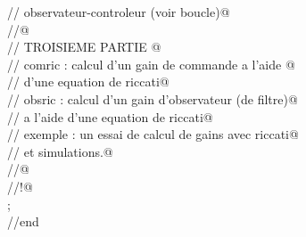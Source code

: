 {\begin{flushleft}
{$$\cmarg \verb@//               observateur-controleur (voir boucle)@\\ 
\cmarg \verb@//@\\ 
\cmarg \verb@//    TROISIEME PARTIE @\\ 
\cmarg \verb@// comric   :  calcul d'un gain de commande a l'aide @\\ 
\cmarg \verb@//          d'une equation de riccati@\\ 
\cmarg \verb@// obsric   :  calcul d'un gain d'observateur (de filtre)@\\ 
\cmarg \verb@//          a l'aide d'une equation de riccati@\\ 
\cmarg \verb@// exemple  : un essai de calcul de gains avec riccati@\\ 
\cmarg \verb@//          et simulations.@\\ 
\cmarg \verb@//@\\ 
\cmarg \verb@//!@\\ 
;\\ 
\cmarg //end}
\end{flushleft}}




\def\Mtdinit{
\begin{flushleft}
{\sl 
\cmarg //$<$$>$=tdinit()\\ 
\cmarg //$<$$>$=tdinit()\\ 
\cmarg \verb@// constantes pour le modele proie-predateur@\\ 
\cmarg \verb@// et le modele de competition  @\\ 
\cmarg \verb@//!@\\ 
\cmarg ppr=1/100;\\ 
\cmarg ppk=1000;\\ 
\cmarg ppa=1/20000;\\ 
\cmarg ppb=1/10000;\\ 
\cmarg ppm=1/100;\\ 
\cmarg pps=1/200;\\ 
\cmarg ppl=500;\\ 
\cmarg $<$ppr,ppk,ppa,ppb,ppm,ppl,pps$>$={\bf resume}(ppr,ppk,ppa,ppb,ppm,ppl,pps);\\ 
\cmarg //end}
\end{flushleft}}



